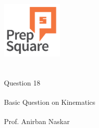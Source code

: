 \documentclass{beamer}
\begin{document}
\begin{center}
\ \\ \ \\
\includegraphics[width=30mm]{Logo-final.png} \\
\ \\ \ \\ 
{\huge Question 18 \\ \ \\ }
{\Large
Basic Question on Kinematics
}
{\large \ \\ \ \\ Prof. Anirban Naskar }
\end{center}
\end{document}
